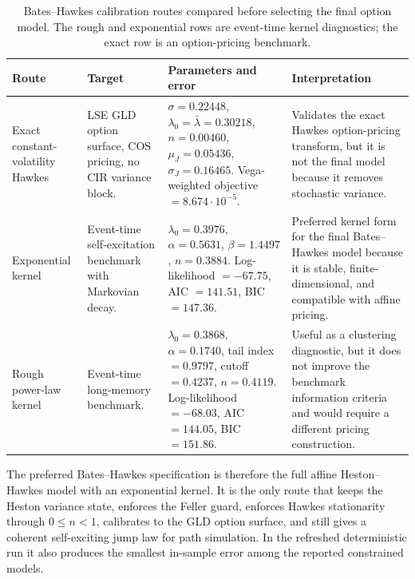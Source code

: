 \documentclass[a4paper,10pt,titlepage,oneside,openany]{book}
\theoremstyle{plain}
\theoremstyle{definition}
\theoremstyle{remark}
\begin{document}
\begin{table}[H]
\centering
\scriptsize
\setlength{\tabcolsep}{2.8pt}
\begin{tabularx}{\textwidth}{@{}>{\RaggedRight\arraybackslash}p{2.3cm}>{\RaggedRight\arraybackslash}p{2.9cm}>{\RaggedRight\arraybackslash}p{4.6cm}>{\RaggedRight\arraybackslash}X@{}}
\toprule
\textbf{Route} & \textbf{Target} & \textbf{Parameters and error} & \textbf{Interpretation} \\
\midrule
Exact constant-volatility Hawkes & LSE GLD option surface, COS pricing, no CIR variance block. & \(\sigma=0.22448\), \(\lambda_0=\bar{\lambda}=0.30218\), \(n=0.00460\), \(\mu_J=0.05436\), \(\sigma_J=0.16465\). Vega-weighted objective \(=8.674\cdot10^{-5}\). & Validates the exact Hawkes option-pricing transform, but it is not the final model because it removes stochastic variance. \\
Exponential kernel & Event-time self-excitation benchmark with Markovian decay. & \(\lambda_0=0.3976\), \(\alpha=0.5631\), \(\beta=1.4497\), \(n=0.3884\). Log-likelihood \(=-67.75\), AIC \(=141.51\), BIC \(=147.36\). & Preferred kernel form for the final Bates--Hawkes model because it is stable, finite-dimensional, and compatible with affine pricing. \\
Rough power-law kernel & Event-time long-memory benchmark. & \(\lambda_0=0.3868\), \(\alpha=0.1740\), tail index \(=0.9797\), cutoff \(=0.4237\), \(n=0.4119\). Log-likelihood \(=-68.03\), AIC \(=144.05\), BIC \(=151.86\). & Useful as a clustering diagnostic, but it does not improve the benchmark information criteria and would require a different pricing construction. \\
\bottomrule
\end{tabularx}
\caption{Bates--Hawkes calibration routes compared before selecting the final option model. The rough and exponential rows are event-time kernel diagnostics; the exact row is an option-pricing benchmark.}
\label{tab:hawkes-methods}
\end{table}

The preferred Bates--Hawkes specification is therefore the full affine Heston--Hawkes model with an exponential kernel. It is the only route that keeps the Heston variance state, enforces the Feller guard, enforces Hawkes stationarity through \(0\leq n<1\), calibrates to the GLD option surface, and still gives a coherent self-exciting jump law for path simulation. In the refreshed deterministic run it also produces the smallest in-sample error among the reported constrained models.
\end{document}
